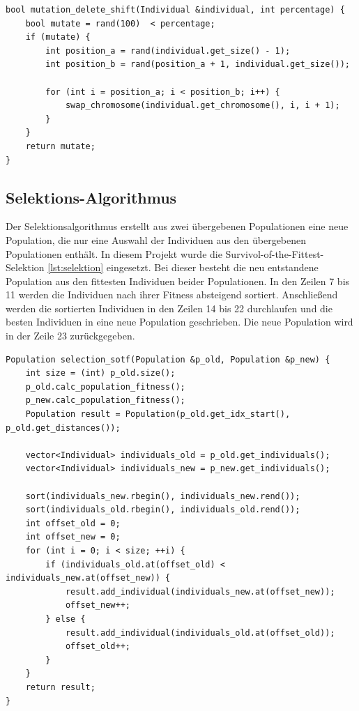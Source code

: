 \begin{minipage}{\linewidth}
\begin{lstlisting}[caption={Delete-Shift-Mutaions-Algorithmus}, firstnumber=1, captionpos=b, label=lst:mutation]
bool mutation_delete_shift(Individual &individual, int percentage) {
	bool mutate = rand(100)  < percentage;
	if (mutate) {
		int position_a = rand(individual.get_size() - 1);
		int position_b = rand(position_a + 1, individual.get_size());
 
		for (int i = position_a; i < position_b; i++) {
			swap_chromosome(individual.get_chromosome(), i, i + 1);
		}
	}
	return mutate;
}
\end{lstlisting}
\end{minipage}
\subsection{Selektions-Algorithmus}
Der Selektionsalgorithmus erstellt aus zwei übergebenen Populationen eine neue Population, die nur eine Auswahl der Individuen aus den übergebenen Populationen enthält.
In diesem Projekt wurde die Survivol-of-the-Fittest-Selektion \ref{lst:selektion} eingesetzt. Bei dieser besteht die neu entstandene Population aus den fittesten Individuen beider Populationen.
In den Zeilen 7 bis 11 werden die Individuen nach ihrer Fitness absteigend sortiert. Anschließend werden die sortierten Individuen in den Zeilen 14 bis 22 durchlaufen und die besten Individuen in eine neue Population geschrieben. Die neue Population wird in der Zeile 23 zurückgegeben.

\begin{minipage}{\linewidth}
\begin{lstlisting}[caption={Survival-Of-The-Fittest-Selektions-Algorithmus}, firstnumber=1, captionpos=b, label=lst:selektion]
Population selection_sotf(Population &p_old, Population &p_new) {
	int size = (int) p_old.size();
	p_old.calc_population_fitness();
	p_new.calc_population_fitness();
	Population result = Population(p_old.get_idx_start(), p_old.get_distances());

	vector<Individual> individuals_old = p_old.get_individuals();
	vector<Individual> individuals_new = p_new.get_individuals();

	sort(individuals_new.rbegin(), individuals_new.rend());
	sort(individuals_old.rbegin(), individuals_old.rend());
	int offset_old = 0;
	int offset_new = 0;
	for (int i = 0; i < size; ++i) {
		if (individuals_old.at(offset_old) < individuals_new.at(offset_new)) {
			result.add_individual(individuals_new.at(offset_new));
			offset_new++;
		} else {
			result.add_individual(individuals_old.at(offset_old));
 			offset_old++;
		}
	}
	return result;
}
\end{lstlisting}
\end{minipage}

